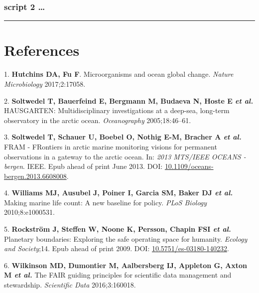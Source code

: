 \documentclass[]{article}
\begin{document}
\hypertarget{script-2}{%
\subsubsection{script 2 \ldots{}}\label{script-2}}

\begin{center}\rule{0.5\linewidth}{\linethickness}\end{center}

\hypertarget{references}{%
\section*{References}\label{references}}

\hypertarget{refs}{}
\leavevmode\hypertarget{ref-Hutchins_2017}{}%
1. \textbf{Hutchins DA, Fu F}. Microorganisms and ocean global change.
\emph{Nature Microbiology} 2017;2:17058.

\leavevmode\hypertarget{ref-Soltwedel_2005}{}%
2. \textbf{Soltwedel T, Bauerfeind E, Bergmann M, Budaeva N, Hoste E
\emph{et al.}} HAUSGARTEN: Multidisciplinary investigations at a
deep-sea, long-term observatory in the arctic ocean. \emph{Oceanography}
2005;18:46--61.

\leavevmode\hypertarget{ref-Soltwedel_2013}{}%
3. \textbf{Soltwedel T, Schauer U, Boebel O, Nothig E-M, Bracher A
\emph{et al.}} FRAM - FRontiers in arctic marine monitoring visions for
permanent observations in a gateway to the arctic ocean. In: \emph{2013
MTS/IEEE OCEANS - bergen}. IEEE. Epub ahead of print June 2013. DOI:
\href{https://doi.org/10.1109/oceans-bergen.2013.6608008}{10.1109/oceans-bergen.2013.6608008}.

\leavevmode\hypertarget{ref-Williams_2010}{}%
4. \textbf{Williams MJ, Ausubel J, Poiner I, Garcia SM, Baker DJ
\emph{et al.}} Making marine life count: A new baseline for policy.
\emph{PLoS Biology} 2010;8:e1000531.

\leavevmode\hypertarget{ref-Rockstr_m_2009}{}%
5. \textbf{Rockström J, Steffen W, Noone K, Persson, Chapin FSI \emph{et
al.}} Planetary boundaries: Exploring the safe operating space for
humanity. \emph{Ecology and Society};14. Epub ahead of print 2009. DOI:
\href{https://doi.org/10.5751/es-03180-140232}{10.5751/es-03180-140232}.

\leavevmode\hypertarget{ref-Wilkinson_2016}{}%
6. \textbf{Wilkinson MD, Dumontier M, Aalbersberg IJ, Appleton G, Axton
M \emph{et al.}} The FAIR guiding principles for scientific data
management and stewardship. \emph{Scientific Data} 2016;3:160018.
\end{document}
